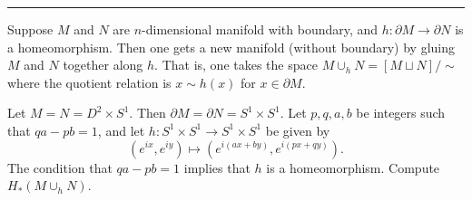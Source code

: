 \documentclass[a4paper, 12pt]{article}
\begin{document}
\noindent\rule{7in}{2.8pt}
\begin{problem}{6}
Suppose \(M\) and \(N\) are \(n\)-dimensional manifold with boundary, and \(h:\partial M\rightarrow \partial N\) is a homeomorphism. Then one gets a new manifold (without boundary) by gluing \(M\) and \(N\) together along \(h\). That is, one takes the 
space \(M\cup_h N=[M\sqcup N]/\sim\) where the quotient relation is \(x\sim h(x)\) for \(x\in \partial M\). 

Let \(M=N=D^2\times S^1\). Then \(\partial M=\partial N=S^1\times S^1\). Let \(p,q,a,b\) be integers such that \(qa-pb=1\), and let \(h:S^1\times S^1\rightarrow S^1\times S^1\) be given by 
\[(e^{ix},e^{iy})\mapsto (e^{i(ax+by)},e^{i(px+qy)}).\]
The condition that \(qa-pb=1\) implies that \(h\) is a homeomorphism. Compute \(H_*(M\cup_h N)\).
\end{problem}
\end{document}
